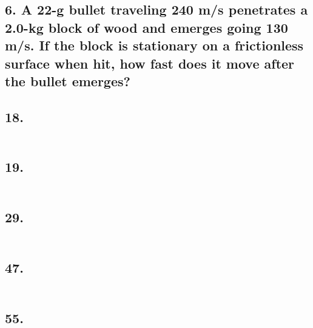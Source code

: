 \documentclass[12pt,a4paper,english]{article}
\begin{document}
\begin{flushleft}
  \subsection{6. A 22-g bullet traveling 240 m/s penetrates a 2.0-kg block of wood and emerges going 130 m/s. If the block is stationary on a frictionless surface when hit, how fast does it move after the bullet emerges?}
  \subsection{18. }
  \begin{align*}
  \end{align*}
  \subsection{19. }
  \begin{align*}
  \end{align*}
  \subsection{29. }
  \begin{align*}
  \end{align*}
  \subsection{47. }
  \begin{align*}
  \end{align*}
  \subsection{55. }
  \begin{align*}
  \end{align*}

\end{flushleft}
\end{document}
